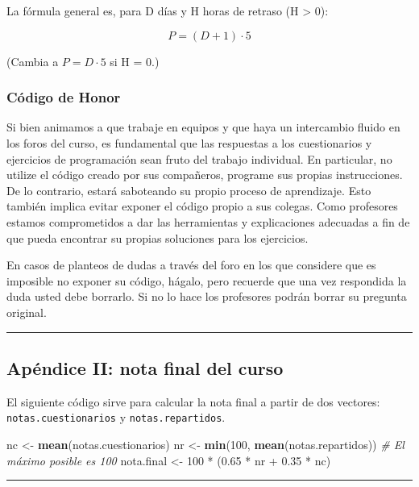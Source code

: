 \documentclass[]{article}
\newenvironment{Shaded}{}{}
\newcommand{\KeywordTok}[1]{\textcolor[rgb]{0.00,0.44,0.13}{\textbf{{#1}}}}
\newcommand{\DecValTok}[1]{\textcolor[rgb]{0.25,0.63,0.44}{{#1}}}
\newcommand{\FloatTok}[1]{\textcolor[rgb]{0.25,0.63,0.44}{{#1}}}
\newcommand{\CommentTok}[1]{\textcolor[rgb]{0.38,0.63,0.69}{\textit{{#1}}}}
\newcommand{\NormalTok}[1]{{#1}}
\begin{document}
La fórmula general es, para D días y H horas de retraso (H
\textgreater{} 0):

\[
  P = (D + 1) \cdot 5
\]

(Cambia a $P = D \cdot 5$ si H = 0.)

\subsubsection{Código de Honor}

Si bien animamos a que trabaje en equipos y que haya un intercambio
fluido en los foros del curso, es fundamental que las respuestas a los
cuestionarios y ejercicios de programación sean fruto del trabajo
individual. En particular, no utilize el código creado por sus
compañeros, programe sus propias instrucciones. De lo contrario, estará
saboteando su propio proceso de aprendizaje. Esto también implica evitar
exponer el código propio a sus colegas. Como profesores estamos
comprometidos a dar las herramientas y explicaciones adecuadas a fin de
que pueda encontrar su propias soluciones para los ejercicios.

En casos de planteos de dudas a través del foro en los que considere que
es imposible no exponer su código, hágalo, pero recuerde que una vez
respondida la duda usted debe borrarlo. Si no lo hace los profesores
podrán borrar su pregunta original.

\begin{center}\rule{3in}{0.4pt}\end{center}

\subsection{Apéndice II: nota final del curso}

El siguiente código sirve para calcular la nota final a partir de dos
vectores: \texttt{notas.cuestionarios} y \texttt{notas.repartidos}.

\begin{Shaded}
\begin{Highlighting}[]
\NormalTok{nc <- }\KeywordTok{mean}\NormalTok{(notas.cuestionarios)}
\NormalTok{nr <- }\KeywordTok{min}\NormalTok{(}\DecValTok{100}\NormalTok{, }\KeywordTok{mean}\NormalTok{(notas.repartidos))  }\CommentTok{# El máximo posible es 100}
\NormalTok{nota.final <- }\DecValTok{100} \NormalTok{* (}\FloatTok{0.65} \NormalTok{* nr + }\FloatTok{0.35} \NormalTok{* nc)}
\end{Highlighting}
\end{Shaded}
\begin{center}\rule{3in}{0.4pt}\end{center}
\end{document}
